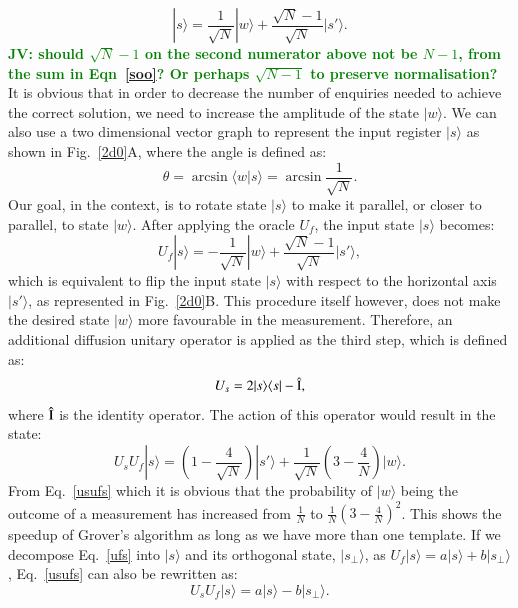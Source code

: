\documentclass[aps,prd,nofootinbib,twocolumn,reprint,superscriptaddress,showpacs,showkeys,longbibliography]{revtex4-1}
\newcommand{\bra}[1]{\langle #1|}
\newcommand{\ket}[1]{|#1\rangle}
\newcommand{\braket}[2]{\langle #1|#2\rangle}
\newcommand{\jv}[1]{\textbf{\textcolor{green}{JV: #1}}}
\begin{document}
\begin{equation}
    \label{so}
    \ket{s}=\frac{1}{\sqrt{N}}\ket{w}+\frac{\sqrt{N}-1}{\sqrt{N}}\ket{s'}.
\end{equation}
\jv{should $\sqrt{N}-1$ on the second numerator above not be $N-1$, from the sum in Eqn~\ref{soo}? Or perhaps $\sqrt{N-1}$ to preserve normalisation?}
It is obvious that in order to decrease the number of enquiries needed to achieve the correct solution, we need to increase the amplitude of the state $\ket{w}$. We can also use a two dimensional vector graph to represent the input register $\ket{s}$ as shown in Fig.~\ref{2d0}A, where the angle is defined as:
\begin{equation}
\label{theta}
   \theta=\arcsin\braket{w}{s} = \arcsin {\frac{1}{\sqrt{N}}}.
\end{equation}
Our goal, in the context, is to rotate state $\ket{s}$ to make it parallel, or closer to parallel, to state $\ket{w}$. After applying the oracle $U_f$, the input state $\ket{s}$ becomes:
\begin{equation}
    \label{ufs}
    U_f\ket{s}=-\frac{1}{\sqrt{N}}\ket{w}+\frac{\sqrt{N}-1}{\sqrt{N}}\ket{s'},
\end{equation}
which is equivalent to flip the input state $\ket{s}$ with respect to the horizontal axis $\ket{s'}$, as represented in Fig.~\ref{2d0}B. This procedure itself however, does not make the desired state $\ket{w}$ more favourable in the measurement. Therefore, an additional diffusion unitary operator is applied as the third step, which is defined as:
\begin{equation}
    \label{Us}
    U_s=2\ket{s}\bra{s}-\hat{\rm I},
\end{equation}
where $\hat{\rm I}$ is the identity operator. The action of this operator would result in the state:
\begin{equation}
    \label{usufs}
    U_sU_f\ket{s}=(1-\frac{4}{\sqrt{N}})\ket{s'}+\frac{1}{\sqrt{N}}(3-\frac{4}{N})\ket{w}.
\end{equation}
From Eq.~\ref{usufs} which it is obvious that the probability of $\ket{w}$ being the outcome of a measurement has increased from $\frac{1}{N}$ to $\frac{1}{N}(3-\frac{4}{N})^2$. This shows the speedup of Grover's algorithm as long as we have more than one template. If we decompose Eq.~\ref{ufs} into $\ket{s}$ and its orthogonal state, $\ket{s_\perp}$, as $U_f\ket{s}=a\ket{s}+b\ket{s_\perp}$, Eq.~\ref{usufs} can also be rewritten as:
\begin{equation}
    \label{usufsp}
    U_sU_f\ket{s}=a\ket{s}-b\ket{s_\perp}.
\end{equation}
\end{document}
